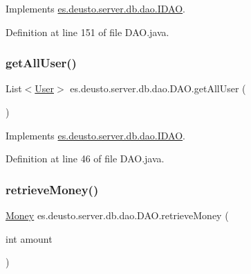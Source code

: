 Implements \hyperlink{interfacees_1_1deusto_1_1server_1_1db_1_1dao_1_1_i_d_a_o_a5a3e4739557f0af9060b4ca90e69c0e3}{es.\+deusto.\+server.\+db.\+dao.\+I\+D\+AO}.



Definition at line 151 of file D\+A\+O.\+java.

\mbox{\label{classes_1_1deusto_1_1server_1_1db_1_1dao_1_1_d_a_o_a0ee6fd52276091b7e40129d1c484ef14}} 
\subsubsection{\texorpdfstring{get\+All\+User()}{getAllUser()}}
{\footnotesize\ttfamily List$<$\hyperlink{classes_1_1deusto_1_1server_1_1db_1_1data_1_1_user}{User}$>$ es.\+deusto.\+server.\+db.\+dao.\+D\+A\+O.\+get\+All\+User (\begin{DoxyParamCaption}{ }\end{DoxyParamCaption})}



Implements \hyperlink{interfacees_1_1deusto_1_1server_1_1db_1_1dao_1_1_i_d_a_o_affa6fc846698427199cb7305155a95c7}{es.\+deusto.\+server.\+db.\+dao.\+I\+D\+AO}.



Definition at line 46 of file D\+A\+O.\+java.

\mbox{\label{classes_1_1deusto_1_1server_1_1db_1_1dao_1_1_d_a_o_a171a709ad2008e5eea8a77db494df1d0}} 
\subsubsection{\texorpdfstring{retrieve\+Money()}{retrieveMoney()}}
{\footnotesize\ttfamily \hyperlink{classes_1_1deusto_1_1server_1_1db_1_1data_1_1_money}{Money} es.\+deusto.\+server.\+db.\+dao.\+D\+A\+O.\+retrieve\+Money (\begin{DoxyParamCaption}\item[{int}]{amount }\end{DoxyParamCaption})}



